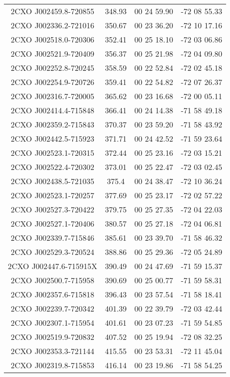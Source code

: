 \begin{table}
\begin{tabular}{cccc}
2CXO J002459.8-720855 & 348.93 & 00 24 59.90 & -72 08 55.33 \\
2CXO J002336.2-721016 & 350.67 & 00 23 36.20 & -72 10 17.16 \\
2CXO J002518.0-720306 & 352.41 & 00 25 18.10 & -72 03 06.86 \\
2CXO J002521.9-720409 & 356.37 & 00 25 21.98 & -72 04 09.80 \\
2CXO J002252.8-720245 & 358.59 & 00 22 52.84 & -72 02 45.18 \\
2CXO J002254.9-720726 & 359.41 & 00 22 54.82 & -72 07 26.37 \\
2CXO J002316.7-720005 & 365.62 & 00 23 16.68 & -72 00 05.11 \\
2CXO J002414.4-715848 & 366.41 & 00 24 14.38 & -71 58 49.18 \\
2CXO J002359.2-715843 & 370.37 & 00 23 59.20 & -71 58 43.92 \\
2CXO J002442.5-715923 & 371.71 & 00 24 42.52 & -71 59 23.64 \\
2CXO J002523.1-720315 & 372.44 & 00 25 23.16 & -72 03 15.21 \\
2CXO J002522.4-720302 & 373.01 & 00 25 22.47 & -72 03 02.45 \\
2CXO J002438.5-721035 & 375.4 & 00 24 38.47 & -72 10 36.24 \\
2CXO J002523.1-720257 & 377.69 & 00 25 23.17 & -72 02 57.22 \\
2CXO J002527.3-720422 & 379.75 & 00 25 27.35 & -72 04 22.03 \\
2CXO J002527.1-720406 & 380.57 & 00 25 27.18 & -72 04 06.81 \\
2CXO J002339.7-715846 & 385.61 & 00 23 39.70 & -71 58 46.32 \\
2CXO J002529.3-720524 & 388.86 & 00 25 29.36 & -72 05 24.89 \\
2CXO J002447.6-715915X & 390.49 & 00 24 47.69 & -71 59 15.37 \\
2CXO J002500.7-715958 & 390.69 & 00 25 00.77 & -71 59 58.31 \\
2CXO J002357.6-715818 & 396.43 & 00 23 57.54 & -71 58 18.41 \\
2CXO J002239.7-720342 & 401.39 & 00 22 39.79 & -72 03 42.44 \\
2CXO J002307.1-715954 & 401.61 & 00 23 07.23 & -71 59 54.85 \\
2CXO J002519.9-720832 & 407.52 & 00 25 19.94 & -72 08 32.25 \\
2CXO J002353.3-721144 & 415.55 & 00 23 53.31 & -72 11 45.04 \\
2CXO J002319.8-715853 & 416.14 & 00 23 19.86 & -71 58 54.25 \\

\end{tabular}
\end{table}

